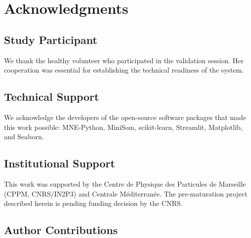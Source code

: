 \section*{Acknowledgments}

\subsection*{Study Participant}

We thank the healthy volunteer who participated in the validation session. Her cooperation was essential for establishing the technical readiness of the system.

\subsection*{Technical Support}

We acknowledge the developers of the open-source software packages that made this work possible: MNE-Python, MiniSom, scikit-learn, Streamlit, Matplotlib, and Seaborn.

\subsection*{Institutional Support}

This work was supported by the Centre de Physique des Particules de Marseille (CPPM, CNRS/IN2P3) and Centrale Méditerranée. The pre-maturation project described herein is pending funding decision by the CNRS.

\subsection*{Author Contributions}

